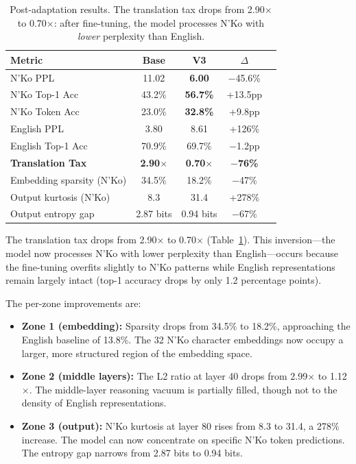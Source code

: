 \documentclass[11pt]{article}
\begin{document}
\begin{table}[t]
\centering
\small
\begin{tabular}{lcccc}
\toprule
\textbf{Metric} & \textbf{Base} & \textbf{V3} & \textbf{$\Delta$} \\
\midrule
N'Ko PPL & 11.02 & \textbf{6.00} & $-$45.6\% \\
N'Ko Top-1 Acc & 43.2\% & \textbf{56.7\%} & +13.5pp \\
N'Ko Token Acc & 23.0\% & \textbf{32.8\%} & +9.8pp \\
\midrule
English PPL & 3.80 & 8.61 & +126\% \\
English Top-1 Acc & 70.9\% & 69.7\% & $-$1.2pp \\
\midrule
\textbf{Translation Tax} & \textbf{2.90$\times$} & \textbf{0.70$\times$} & \textbf{$-$76\%} \\
\midrule
Embedding sparsity (N'Ko) & 34.5\% & 18.2\% & $-$47\% \\
Output kurtosis (N'Ko) & 8.3 & 31.4 & +278\% \\
Output entropy gap & 2.87 bits & 0.94 bits & $-$67\% \\
\bottomrule
\end{tabular}
\caption{Post-adaptation results. The translation tax drops from 2.90$\times$ to 0.70$\times$: after fine-tuning, the model processes N'Ko with \emph{lower} perplexity than English.}
\label{tab:main-results}
\end{table}

The translation tax drops from 2.90$\times$ to 0.70$\times$ (Table~\ref{tab:main-results}).
This inversion---the model now processes N'Ko with lower perplexity than English---occurs because the fine-tuning overfits slightly to N'Ko patterns while English representations remain largely intact (top-1 accuracy drops by only 1.2 percentage points).

The per-zone improvements are:
\begin{itemize}
\item \textbf{Zone 1 (embedding):} Sparsity drops from 34.5\% to 18.2\%, approaching the English baseline of 13.8\%. The 32 N'Ko character embeddings now occupy a larger, more structured region of the embedding space.
\item \textbf{Zone 2 (middle layers):} The L2 ratio at layer 40 drops from 2.99$\times$ to 1.12$\times$. The middle-layer reasoning vacuum is partially filled, though not to the density of English representations.
\item \textbf{Zone 3 (output):} N'Ko kurtosis at layer 80 rises from 8.3 to 31.4, a 278\% increase. The model can now concentrate on specific N'Ko token predictions. The entropy gap narrows from 2.87 bits to 0.94 bits.
\end{itemize}
\end{document}
